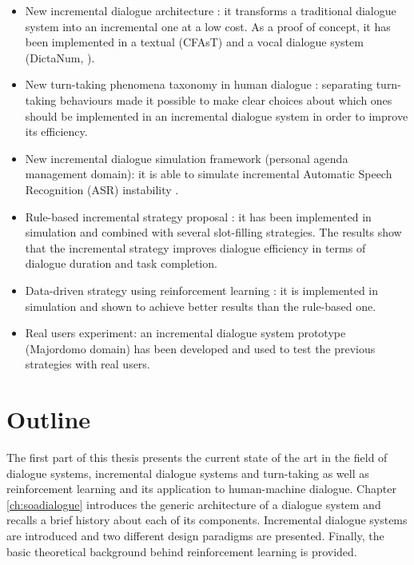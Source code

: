 				\begin{itemize}
					\item New incremental dialogue architecture : it transforms a traditional dialogue system into an incremental one at a low cost. As a proof of concept, it has been implemented in a textual (CFAsT) and a vocal dialogue system (DictaNum, ).
					\item New turn-taking phenomena taxonomy in human dialogue : separating turn-taking behaviours made it possible to make clear choices about which ones should be implemented in an incremental dialogue system in order to improve its efficiency.
					\item New incremental dialogue simulation framework (personal agenda management domain): it is able to simulate incremental Automatic Speech Recognition (ASR) instability .
					\item Rule-based incremental strategy proposal : it has been implemented in simulation and combined with several slot-filling strategies. The results show that the incremental strategy improves dialogue efficiency in terms of dialogue duration and task completion.
					\item Data-driven strategy using reinforcement learning : it is implemented in simulation and shown to achieve better results than the rule-based one.
					\item Real users experiment: an incremental dialogue system prototype (Majordomo domain) has been developed and used to test the previous strategies with real users.
				\end{itemize}
				
\section*{Outline}

				The first part of this thesis presents the current state of the art in the field of dialogue systems, incremental dialogue systems and turn-taking as well as reinforcement learning and its application to human-machine dialogue. Chapter \ref{ch:soadialogue} introduces the generic architecture of a dialogue system and recalls a brief history about each of its components. Incremental dialogue systems are introduced and two different design paradigms are presented. Finally, the basic theoretical background behind reinforcement learning is provided.
				
